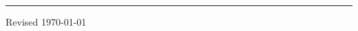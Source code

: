 \documentclass{cv} %
\begin{document}

















\noindent\rule{\textwidth}{0.4pt}
\vspace{1mm}
\hfill Revised \today
\end{document}
